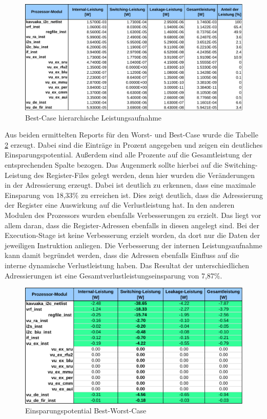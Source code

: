 \begin{figure}[H] 
	\centering
	\includegraphics[width=\textwidth]{fig/best_hierarchy_report.pdf}
	\caption{Best-Case hierarchische Leistungsaufnahme}
	\label{fig:best_power_hierarchy}
\end{figure}

Aus beiden ermittelten Reports für den Worst- und Best-Case wurde die Tabelle \ref{fig:best_powersave} erzeugt. Dabei sind die Einträge in Prozent angegeben und zeigen ein deutliches Einsparungspotential. Außerdem sind alle Prozente auf die Gesamtleistung der entsprechenden Spalte bezogen. Das Augenmerk sollte hierbei auf die Switching-Leistung des Register-Files gelegt werden, denn hier wurden die Veränderungen in der Adressierung erzeugt. Dabei ist deutlich zu erkennen, dass eine maximale Einsparung von 18,33\% zu erreichen ist. Dies zeigt deutlich, dass die Adressierung der Register eine Auswirkung auf die Verlustleistung hat. In den anderen Modulen des Prozessors wurden ebenfalls Verbesserungen zu erzielt. Das liegt vor allem daran, dass die Register-Adressen ebenfalls in diesen angelegt sind. Bei der Execution-Stage ist keine Verbesserung erzielt worden, da dort nur die Daten der jeweiligen Instruktion anliegen. Die Verbesserung der internen Leistungsaufnahme kann damit begründet werden, dass die Adressen ebenfalls Einfluss auf die interne dynamische Verlustleistung haben.
Das Resultat der unterschiedlichen Adressierungen ist eine Gesamtverlustleistungseinsparung von 7,87\%.

\begin{figure}[H] 
	\centering
	\includegraphics[width=\textwidth]{fig/best_worst_compare.pdf}
	\caption{Einsparungspotential Best-Worst-Case}
	\label{fig:best_powersave}
\end{figure}
